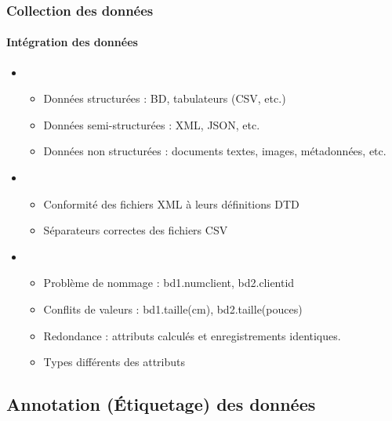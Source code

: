 \documentclass[xcolor=table]{beamer}
\begin{document}
\begin{frame}
\frametitle{Collection des données}
\framesubtitle{Intégration des données}

\begin{itemize}
	\item {}
	\begin{itemize}
		\item Données structurées : BD, tabulateurs (CSV, etc.)
		\item Données semi-structurées : XML, JSON, etc.
		\item Données non structurées : documents textes, images, métadonnées, etc.
	\end{itemize}
	\item {}
	\begin{itemize}
		\item Conformité des fichiers XML à leurs définitions DTD
		\item Séparateurs correctes des fichiers CSV
	\end{itemize}
	\item {}
	\begin{itemize}
		\item Problème de nommage : bd1.numclient, bd2.clientid
		\item Conflits de valeurs : bd1.taille(cm), bd2.taille(pouces)
		\item Redondance : attributs calculés et enregistrements identiques.
		\item Types différents des attributs
	\end{itemize}
\end{itemize}

\end{frame}


\subsection{Annotation (Étiquetage) des données}
\end{document}
